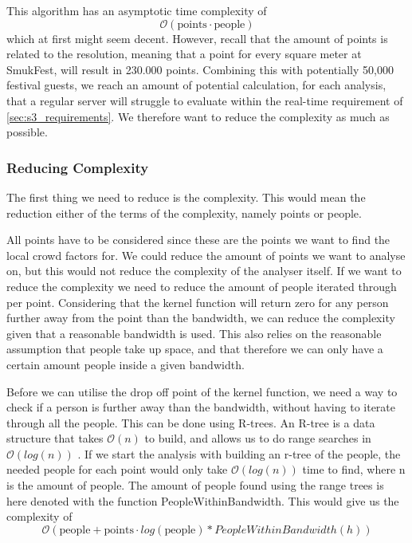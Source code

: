 This algorithm has an asymptotic time complexity of $$\mathcal{O}(\text{points} \cdot \text{people})$$ which at first might seem decent. However, recall that the amount of points is related to the resolution, meaning that a point for every square meter at SmukFest, will result in 230.000 points\cite{smukFacts}. Combining this with potentially 50,000 festival guests\cite{smukFacts}, we reach an amount of potential calculation, for each analysis, that a regular server will struggle to evaluate within the real-time requirement of \cref{sec:s3_requirements}. We therefore want to reduce the complexity as much as possible.


\subsubsection{Reducing Complexity}

The first thing we need to reduce is the complexity. This would mean the reduction either of the terms of the complexity, namely points or people.

All points have to be considered since these are the points we want to find the local crowd factors for. We could reduce the amount of points we want to analyse on, but this would not reduce the complexity of the analyser itself. If we want to reduce the complexity we need to reduce the amount of people iterated through per point. Considering that the kernel function will return zero for any person further away from the point than the bandwidth, we can reduce the complexity given that a reasonable bandwidth is used. This also relies on the reasonable assumption that people take up space, and that therefore we can only have a certain amount people inside a given bandwidth.

Before we can utilise the drop off point of the kernel function, we need a way to check if a person is further away than the bandwidth, without having to iterate through all the people. This can be done using R-trees. An R-tree is a data structure that takes $\mathcal{O}(n)$ to build, and allows us to do range searches in $\mathcal{O}(log(n))$ \cite{rtree}. If we start the analysis with building an r-tree of the people, the needed people for each point would only take $\mathcal{O}(log(n))$ time to find, where n is the amount of people. The amount of people found using the range trees is here denoted with the function PeopleWithinBandwidth. This would give us the complexity of $$\mathcal{O}(\text{people} + \text{points} \cdot log(\text{people}) * PeopleWithinBandwidth(h))$$

